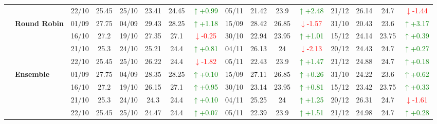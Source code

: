 {\begin{longtable}{llcc|cccc|cccc|cccc}
&
& 22/10 & 25.45 & 25/10 & 23.41 & 24.45 & \textcolor{green}{\(\uparrow\)+0.99} & 05/11 & 21.42 & 23.9 & \textcolor{green}{\(\uparrow\)+2.48} & 21/12 & 26.14 & 24.7 & \textcolor{red}{\(\downarrow\)-1.44} \\
\cmidrule(lr){2-16}


& \textbf{Round Robin}
& 01/09 & 27.75 & 04/09 & 29.43 & 28.25 & \textcolor{green}{\(\uparrow\)+1.18} & 15/09 & 28.42 & 26.85 & \textcolor{red}{\(\downarrow\)-1.57} & 31/10 & 20.43 & 23.6 & \textcolor{green}{\(\uparrow\)+3.17} \\

&
& 16/10 & 27.2 & 19/10 & 27.35 & 27.1 & \textcolor{red}{\(\downarrow\)-0.25} & 30/10 & 22.94 & 23.95 & \textcolor{green}{\(\uparrow\)+1.01} & 15/12 & 24.14 & 23.75 & \textcolor{green}{\(\uparrow\)+0.39} \\

&
& 21/10 & 25.3 & 24/10 & 25.21 & 24.4 & \textcolor{green}{\(\uparrow\)+0.81} & 04/11 & 26.13 & 24 & \textcolor{red}{\(\downarrow\)-2.13} & 20/12 & 24.43 & 24.7 & \textcolor{green}{\(\uparrow\)+0.27} \\

&
& 22/10 & 25.45 & 25/10 & 26.22 & 24.4 & \textcolor{red}{\(\downarrow\)-1.82} & 05/11 & 22.43 & 23.9 & \textcolor{green}{\(\uparrow\)+1.47} & 21/12 & 24.88 & 24.7 & \textcolor{green}{\(\uparrow\)+0.18} \\
\cmidrule(lr){2-16}



& \textbf{Ensemble}
& 01/09 & 27.75 & 04/09 & 28.35 & 28.25 & \textcolor{green}{\(\uparrow\)+0.10} & 15/09 & 27.11 & 26.85 & \textcolor{green}{\(\uparrow\)+0.26} & 31/10 & 24.22 & 23.6 & \textcolor{green}{\(\uparrow\)+0.62} \\

&
& 16/10 & 27.2 & 19/10 & 26.15 & 27.1 & \textcolor{green}{\(\uparrow\)+0.95} & 30/10 & 23.14 & 23.95 & \textcolor{green}{\(\uparrow\)+0.81} & 15/12 & 23.42 & 23.75 & \textcolor{green}{\(\uparrow\)+0.33} \\

&
& 21/10 & 25.3 & 24/10 & 24.3 & 24.4 & \textcolor{green}{\(\uparrow\)+0.10} & 04/11 & 25.25 & 24 & \textcolor{green}{\(\uparrow\)+1.25} & 20/12 & 26.31 & 24.7 & \textcolor{red}{\(\downarrow\)-1.61} \\

&
& 22/10 & 25.45 & 25/10 & 24.47 & 24.4 & \textcolor{green}{\(\uparrow\)+0.07} & 05/11 & 22.39 & 23.9 & \textcolor{green}{\(\uparrow\)+1.51} & 21/12 & 24.98 & 24.7 & \textcolor{green}{\(\uparrow\)+0.28} \\


\bottomrule
\end{longtable}
}

